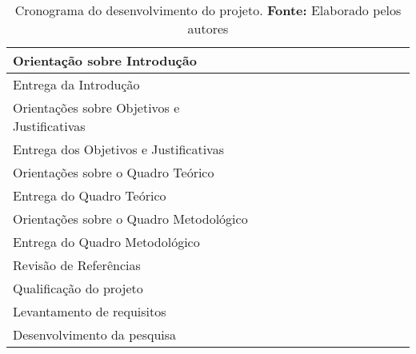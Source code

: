 \begin{table}[htbp]
\begin{tabular}{|p{60mm}|p{3mm}|p{3mm}|p{3mm}|p{3mm}|p{3mm}|p{3mm}|p{3mm}|p{3mm}|p{3mm}|p{3mm}|p{3mm}|p{3mm}|}
		Orientação sobre Introdução &  & \cellcolor[HTML]{000000} &  &  &  &  &  &  &  &  &  & \\ \hline %
		
		Entrega da Introdução &  & \cellcolor[HTML]{000000} &  &  &  &  &  &  &  &  &  & \\ \hline %
		
		Orientações sobre Objetivos e Justificativas &  & \cellcolor[HTML]{000000} &  &  &  &  &  &  &  &  &  & \\ \hline %
		
		Entrega dos Objetivos e Justificativas &  & \cellcolor[HTML]{000000} &  &  &  &  &  &  &  &  &  & \\ \hline %
		
		Orientações sobre o Quadro Teórico &  & \cellcolor[HTML]{000000} & \cellcolor[HTML]{000000} &  &  &  &  &  &  &  &  & \\ \hline %
		
		Entrega do Quadro Teórico &  &  & \cellcolor[HTML]{000000} &  &  &  &  &  &  &  &  & \\ \hline %
		
		Orientações sobre o Quadro Metodológico &  &  & \cellcolor[HTML]{000000} & \cellcolor[HTML]{000000} &  &  &  &  &  &  &  & \\ \hline %
		
		Entrega do Quadro Metodológico &  &  &  & \cellcolor[HTML]{000000} &  &  &  &  &  &  &  & \\ \hline %
		
		Revisão de Referências &  &  &  & \cellcolor[HTML]{000000} & \cellcolor[HTML]{000000} &  &  &  &  &  &  & \\ \hline %
		
		Qualificação do projeto  &  &  &  &  & \cellcolor[HTML]{000000} &  &  &  &  &  &  & \\ \hline %
		
		Levantamento de requisitos &  &  &  &  & \cellcolor[HTML]{000000} & \cellcolor[HTML]{000000} &  &  &  &  &  & \\ \hline %
		
		Desenvolvimento da pesquisa &  &  &  &  &  & \cellcolor[HTML]{000000} & \cellcolor[HTML]{000000}  & \cellcolor[HTML]{000000} & \cellcolor[HTML]{000000} & \cellcolor[HTML]{000000} & \cellcolor[HTML]{000000} & \\ \hline %
	\end{tabular}
	\caption{Cronograma do desenvolvimento do projeto. \textbf{Fonte:} Elaborado pelos autores}
\end{table}